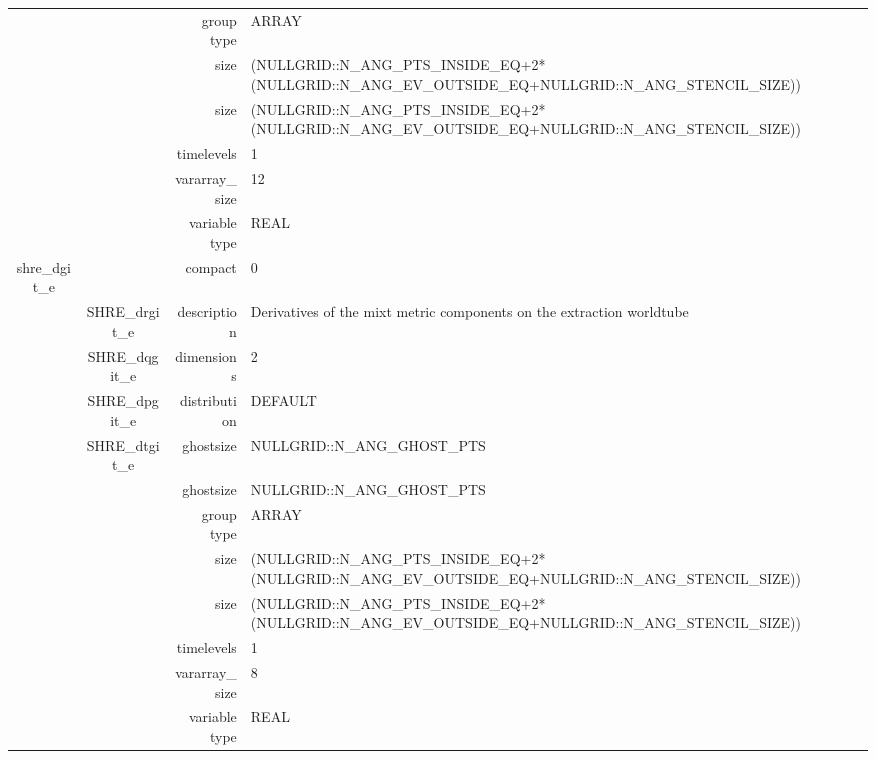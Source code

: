\begin{tabular*}{150mm}{|c|c@{\extracolsep{\fill}}|rl|}
 &  & group type & ARRAY \\ 
 &  & size & (NULLGRID::N\_ANG\_PTS\_INSIDE\_EQ+2*(NULLGRID::N\_ANG\_EV\_OUTSIDE\_EQ+NULLGRID::N\_ANG\_STENCIL\_SIZE)) \\ 
& ~ & size & (NULLGRID::N\_ANG\_PTS\_INSIDE\_EQ+2*(NULLGRID::N\_ANG\_EV\_OUTSIDE\_EQ+NULLGRID::N\_ANG\_STENCIL\_SIZE)) \\ 
 &  & timelevels & 1 \\ 
 &  & vararray\_size & 12 \\ 
 &  & variable type & REAL \\ 
\hline 
shre\_dgit\_e &  & compact & 0 \\ 
 & SHRE\_drgit\_e & description & Derivatives of the mixt metric components on the extraction worldtube \\ 
 & SHRE\_dqgit\_e & dimensions & 2 \\ 
 & SHRE\_dpgit\_e & distribution & DEFAULT \\ 
 & SHRE\_dtgit\_e & ghostsize & NULLGRID::N\_ANG\_GHOST\_PTS \\ 
& ~ & ghostsize & NULLGRID::N\_ANG\_GHOST\_PTS \\ 
 &  & group type & ARRAY \\ 
 &  & size & (NULLGRID::N\_ANG\_PTS\_INSIDE\_EQ+2*(NULLGRID::N\_ANG\_EV\_OUTSIDE\_EQ+NULLGRID::N\_ANG\_STENCIL\_SIZE)) \\ 
& ~ & size & (NULLGRID::N\_ANG\_PTS\_INSIDE\_EQ+2*(NULLGRID::N\_ANG\_EV\_OUTSIDE\_EQ+NULLGRID::N\_ANG\_STENCIL\_SIZE)) \\ 
 &  & timelevels & 1 \\ 
 &  & vararray\_size & 8 \\ 
 &  & variable type & REAL \\ 
\hline 
\end{tabular*} 



\vspace{5mm}
\vspace{5mm}

